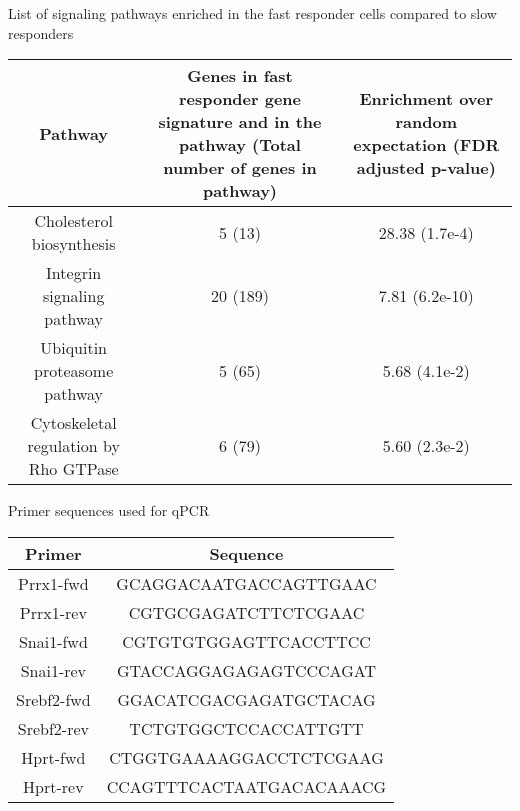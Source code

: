 \begin{supptable}[htb]
\centering
\caption{List of signaling pathways enriched in the fast responder cells compared to slow responders}
\begin{tabular}{ | c | c | c | }
\toprule
\textbf{Pathway} & \textbf{Genes in fast responder gene signature and in the pathway (Total number of genes in pathway)} & \textbf{Enrichment over random expectation (FDR adjusted p-value)} \\
\midrule
Cholesterol biosynthesis & 5 (13) & 28.38 (1.7e-4) \\
Integrin signaling pathway & 20 (189) & 7.81 (6.2e-10) \\
Ubiquitin proteasome pathway & 5 (65) & 5.68 (4.1e-2) \\
Cytoskeletal regulation by Rho GTPase & 6 (79) & 5.60 (2.3e-2) \\
\bottomrule
\end{tabular}
\label{tab:hedgehog_tableS2}
\end{supptable}


\begin{supptable}[htb]
\centering
\caption{Primer sequences used for qPCR}
\begin{tabular}{ | c | c | }
\toprule
\textbf{Primer} & \textbf{Sequence} \\
\midrule
Prrx1-fwd & GCAGGACAATGACCAGTTGAAC \\
Prrx1-rev & CGTGCGAGATCTTCTCGAAC \\
Snai1-fwd & CGTGTGTGGAGTTCACCTTCC \\
Snai1-rev & GTACCAGGAGAGAGTCCCAGAT \\
Srebf2-fwd & GGACATCGACGAGATGCTACAG \\
Srebf2-rev & TCTGTGGCTCCACCATTGTT \\
Hprt-fwd & CTGGTGAAAAGGACCTCTCGAAG \\
Hprt-rev & CCAGTTTCACTAATGACACAAACG \\
\bottomrule
\end{tabular}
\label{tab:hedgehog_tableS3}
\end{supptable}